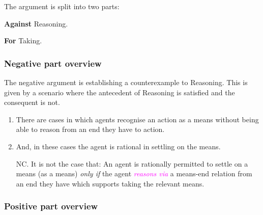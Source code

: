 \documentclass[10pt]{article}
\newcommand{\schemaName}[1]{\textsf{#1}}
\begin{document}
The argument is split into two parts:
\begin{enumerate*}[label=\roman*., ref=(\roman*)]
\item\label{position:Against} \textbf{Against} \schemaName{Reasoning}.
\item\label{position:For} \textbf{For} \schemaName{Taking}.
\end{enumerate*}

\subsubsection{Negative part overview}
\label{sec:negat-part-overv}

The negative argument is establishing a counterexample to \schemaName{Reasoning}.
This is given by a scenario where the antecedent of \schemaName{Reasoning} is satisfied and the consequent is not.

\begin{enumerate}[label=N\arabic*., ref=(N\arabic*)]
\item\label{scenarios:exist} There are cases in which agents recognise an action as a means without being able to reason from an end they have to action.
\item\label{scenarios:persmissible} And, in these cases the agent is rational in settling on the means.
\item[NC.]\label{scenario:no-reasoning} It is not the case that:
  An agent is rationally permitted to settle on a means (as a means)  \emph{only if} the agent \textcolor{fuchsia}{\emph{reasons via}} a means-end relation from an end they have which supports taking the relevant means.
\end{enumerate}

\subsubsection{Positive part overview}
\label{sec:posit-part-overv}




\end{document}
